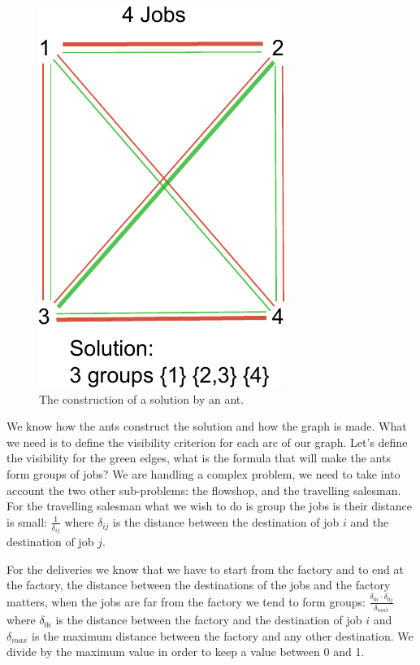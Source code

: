 \documentclass[UTF8, twoside]{EPURapport}
\begin{document}
\begin{figure} [h]
	\centering \includegraphics{images/ant_colony_graph.pdf}
	\caption {The construction of a solution by an ant.}	
	\label {ant_colony_graph}
\end{figure}

	We know how the ants construct the solution and how the graph is made. What we need is to define the visibility criterion for each arc of our graph. Let's define the visibility for the green edges, what is the formula that will make the ants form groups of jobs? We are handling a complex problem, we need to take into account the two other sub-problems: the flowshop, and the travelling salesman.
\\
	
	For the travelling salesman what we wish to do is group the jobs is their distance is small: $\frac{1}{\delta_{ij}}$ where $\delta_{ij}$ is the distance between the destination of job $i$ and the destination of job $j$. 
	
	For the deliveries we know that we have to start from the factory and to end at the factory, the distance between the destinations of the jobs and the factory matters, when the jobs are far from the factory we tend to form groups: $\frac{\delta_{0i} \cdot \delta_{0j}}{\delta_{max}}$ where $\delta_{0i}$ is the distance between the factory and the destination of job $i$ and $\delta_{max}$ is the maximum distance between the factory and any other destination. We divide by the maximum value in order to keep a value between 0 and 1.
	
\end{document}

